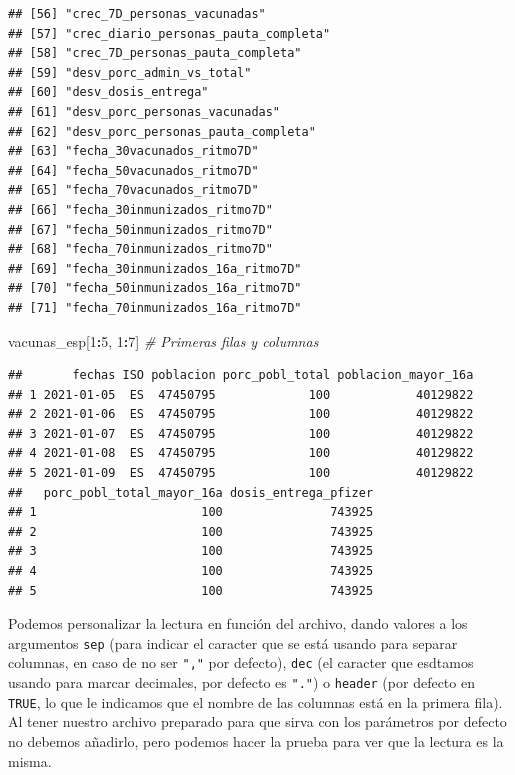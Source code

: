\documentclass[11pt,]{book}
\newenvironment{Shaded}{\begin{snugshade}}{\end{snugshade}}
\newcommand{\CommentTok}[1]{\textcolor[rgb]{0.37,0.37,0.37}{\textit{#1}}}
\newcommand{\DecValTok}[1]{\textcolor[rgb]{0.06,0.06,0.06}{#1}}
\newcommand{\NormalTok}[1]{#1}
\newcommand{\OperatorTok}[1]{\textcolor[rgb]{0.43,0.43,0.43}{\textbf{#1}}}
\begin{document}
\begin{verbatim}
## [56] "crec_7D_personas_vacunadas"          
## [57] "crec_diario_personas_pauta_completa" 
## [58] "crec_7D_personas_pauta_completa"     
## [59] "desv_porc_admin_vs_total"            
## [60] "desv_dosis_entrega"                  
## [61] "desv_porc_personas_vacunadas"        
## [62] "desv_porc_personas_pauta_completa"   
## [63] "fecha_30vacunados_ritmo7D"           
## [64] "fecha_50vacunados_ritmo7D"           
## [65] "fecha_70vacunados_ritmo7D"           
## [66] "fecha_30inmunizados_ritmo7D"         
## [67] "fecha_50inmunizados_ritmo7D"         
## [68] "fecha_70inmunizados_ritmo7D"         
## [69] "fecha_30inmunizados_16a_ritmo7D"     
## [70] "fecha_50inmunizados_16a_ritmo7D"     
## [71] "fecha_70inmunizados_16a_ritmo7D"
\end{verbatim}

\begin{Shaded}
\begin{Highlighting}[]
\NormalTok{vacunas_esp[}\DecValTok{1}\OperatorTok{:}\DecValTok{5}\NormalTok{, }\DecValTok{1}\OperatorTok{:}\DecValTok{7}\NormalTok{] }\CommentTok{# Primeras filas y columnas}
\end{Highlighting}
\end{Shaded}

\begin{verbatim}
##       fechas ISO poblacion porc_pobl_total poblacion_mayor_16a
## 1 2021-01-05  ES  47450795             100            40129822
## 2 2021-01-06  ES  47450795             100            40129822
## 3 2021-01-07  ES  47450795             100            40129822
## 4 2021-01-08  ES  47450795             100            40129822
## 5 2021-01-09  ES  47450795             100            40129822
##   porc_pobl_total_mayor_16a dosis_entrega_pfizer
## 1                       100               743925
## 2                       100               743925
## 3                       100               743925
## 4                       100               743925
## 5                       100               743925
\end{verbatim}

Podemos personalizar la lectura en función del archivo, dando valores a los argumentos \texttt{sep} (para indicar el caracter que se está usando para separar columnas, en caso de no ser \texttt{","} por defecto), \texttt{dec} (el caracter que esdtamos usando para marcar decimales, por defecto es \texttt{"."}) o \texttt{header} (por defecto en \texttt{TRUE}, lo que le indicamos que el nombre de las columnas está en la primera fila). Al tener nuestro archivo preparado para que sirva con los parámetros por defecto no debemos añadirlo, pero podemos hacer la prueba para ver que la lectura es la misma.
\end{document}
